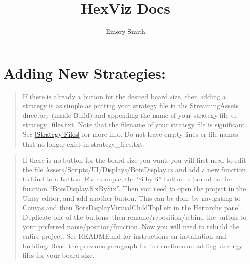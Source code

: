 \documentclass{article}
\begin{document}
\title{HexViz Docs}
\author{Emery Smith}
\clearpage
\maketitle
{}
\thispagestyle{empty}
\newpage\null\thispagestyle{empty}%

\section{Adding New Strategies:}
\label{Adding New Strategies}
\begin{quote}
If there is already a button for the desired board size, then adding a strategy is as simple as putting your strategy file in the StreamingAssets directory (inside Build) and appending the name of your strategy file to strategy\_files.txt. Note that the filename of your strategy file is significant. See \ref{Strategy Files} for more info. Do not leave empty lines or file names that no longer exist in strategy\_files.txt.  
\end{quote}
\begin{quote}
  If there is no button for the board size you want, you will first need to edit the file Assets/Scripts/UI/Displays/BotsDisplay.cs and add a new function to bind to a button. For example, the ``6 by 6'' button is bound to the function ``BotsDisplay.SixBySix''. Then you need to open the project in the Unity editor, and add another button. This can be done by navigating to Canvas and then BotsDisplayVirtualChildTopLeft in the Heirarchy panel. Duplicate one of the buttons, then rename/reposition/rebind the button to your preferred name/position/function. Now you will need to rebuild the entire project. See README.md for instructions on installation and building. Read the previous paragraph for instructions on adding strategy files for your board size.
\end{quote}
\end{document}
